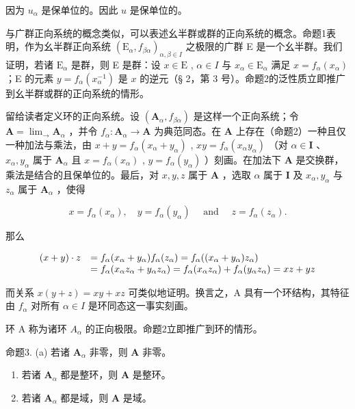 因为 \(u_{\alpha}\) 是保单位的。因此 \(u\) 是保单位的。

与广群正向系统的概念类似，可以表述幺半群或群的正向系统的概念。命题1表明，作为幺半群正向系统 \((\mathrm{E}_{\alpha}, f_{\beta \alpha})_{\alpha, \beta \in I}\) 之极限的广群 E 是一个幺半群。我们证明，若诸 \(\mathrm{E}_{\alpha}\) 是群，则 E 是群：设 \(x \in \mathrm{E}\) , \(\alpha \in I\) 与 \(x_{\alpha} \in \mathrm{E}_{\alpha}\) 满足 \(x = f_{\alpha}(x_{\alpha})\) ；E 的元素 \(y = f_{\alpha}(x_{\alpha}^{-1})\) 是 \(x\) 的逆元（§ 2，第 3 号）。命题2的泛性质立即推广到幺半群或群的正向系统的情形。

留给读者定义环的正向系统。设 \((\mathbf{A}_{\alpha}, f_{\beta \alpha})\) 是这样一个正向系统；令 \(\mathbf{A} = \lim_{\longrightarrow} \mathbf{A}_{\alpha}\) ，并令 \(f_{\alpha}: \mathbf{A}_{\alpha} \to \mathbf{A}\) 为典范同态。在 \(\mathbf{A}\) 上存在（命题2）一种且仅一种加法与乘法，由 \(x + y = f_{\alpha}(x_{\alpha} + y_{\alpha})\) , \(xy = f_{\alpha}(x_{\alpha}y_{\alpha})\) （对 \(\alpha \in \mathbf{I}\) 、 \(x_{\alpha}, y_{\alpha}\) 属于 \(\mathbf{A}_{\alpha}\) 且 \(x = f_{\alpha}(x_{\alpha})\) , \(y = f_{\alpha}(y_{\alpha})\) ）刻画。在加法下 \(\mathbf{A}\) 是交换群，乘法是结合的且保单位的。最后，对 \(x, y, z\) 属于 \(\mathbf{A}\) ，选取 \(\alpha\) 属于 \(\mathbf{I}\) 及 \(x_{\alpha}, y_{\alpha}\) 与 \(z_{\alpha}\) 属于 \(\mathbf{A}_{\alpha}\) ，使得

\[
x = f _ {\alpha} (x _ {\alpha}), \quad y = f _ {\alpha} (y _ {\alpha}) \quad \text { and } \quad z = f _ {\alpha} (z _ {\alpha}).
\]

那么

\[
\begin{array}{r l} (x + y) \cdot z & = f _ {\alpha} (x _ {\alpha} + y _ {\alpha}) f _ {\alpha} (z _ {\alpha}) = f _ {\alpha} ((x _ {\alpha} + y _ {\alpha}) z _ {\alpha}) \\ & = f _ {\alpha} (x _ {\alpha} z _ {\alpha} + y _ {\alpha} z _ {\alpha}) = f _ {\alpha} (x _ {\alpha} z _ {\alpha}) + f _ {\alpha} (y _ {\alpha} z _ {\alpha}) = x z + y z \end{array}
\]

而关系 \(x(y + z) = xy + xz\) 可类似地证明。换言之，A 具有一个环结构，其特征由 \(f_{\alpha}\) 对所有 \(\alpha \in I\) 是环同态这一事实刻画。

环 A 称为诸环 \(A_{\alpha}\) 的正向极限。命题2立即推广到环的情形。

命题3. (a) 若诸 \(\mathbf{A}_{\alpha}\) 非零，则 \(\mathbf{A}\) 非零。

\begin{enumerate}
\def\labelenumi{(\alph{enumi})}
\setcounter{enumi}{1}
\item
  若诸 \(\mathbf{A}_{\alpha}\) 都是整环，则 \(\mathbf{A}\) 是整环。
\item
  若诸 \(\mathbf{A}_{\alpha}\) 都是域，则 \(\mathbf{A}\) 是域。
\end{enumerate}

